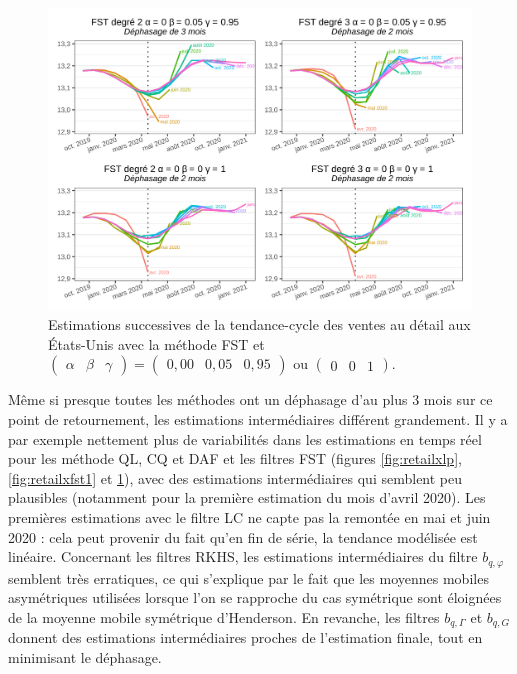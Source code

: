 \documentclass[
  12pt,
  french,
  12pt,a4paper]{article}
\newcommand\1{\mathds{1}}
\begin{document}
\begin{figure}

{\centering \includegraphics[width=0.9\linewidth]{img/nber/retailx_fstp2} 

}

\caption[Estimations successives de la tendance-cycle des ventes au détail aux États-Unis avec la méthode FST et \(\begin{pmatrix}\alpha&\beta&\gamma\end{pmatrix} =\begin{pmatrix}0,00 &0,05&0,95\end{pmatrix}\) ou \(\begin{pmatrix}0 &0&1\end{pmatrix}\)]{Estimations successives de la tendance-cycle des ventes au détail aux États-Unis avec la méthode FST et \(\begin{pmatrix}\alpha&\beta&\gamma\end{pmatrix} =\begin{pmatrix}0,00 &0,05&0,95\end{pmatrix}\) ou \(\begin{pmatrix}0 &0&1\end{pmatrix}\).}\label{fig:retailxfst2}

\footnotesize
\normalsize\end{figure}

Même si presque toutes les méthodes ont un déphasage d'au plus 3 mois sur ce point de retournement, les estimations intermédiaires différent grandement.
Il y a par exemple nettement plus de variabilités dans les estimations en temps réel pour les méthode QL, CQ et DAF et les filtres FST (figures \ref{fig:retailxlp}, \ref{fig:retailxfst1} et \ref{fig:retailxfst2}), avec des estimations intermédiaires qui semblent peu plausibles (notamment pour la première estimation du mois d'avril 2020). Les premières estimations avec le filtre LC ne capte pas la remontée en mai et juin 2020 : cela peut provenir du fait qu'en fin de série, la tendance modélisée est linéaire.
Concernant les filtres RKHS, les estimations intermédiaires du filtre \(b_{q,\varphi}\) semblent très erratiques, ce qui s'explique par le fait que les moyennes mobiles asymétriques utilisées lorsque l'on se rapproche du cas symétrique sont éloignées de la moyenne mobile symétrique d'Henderson.
En revanche, les filtres \(b_{q,\Gamma}\) et \(b_{q,G}\) donnent des estimations intermédiaires proches de l'estimation finale, tout en minimisant le déphasage.
\end{document}
